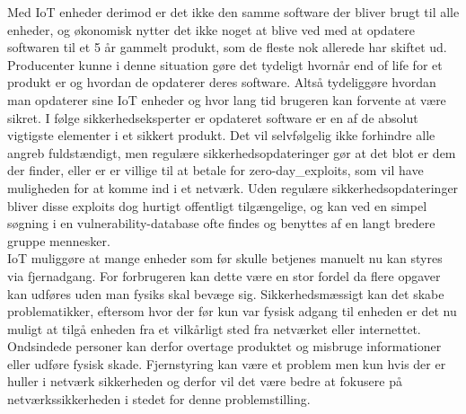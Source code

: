     Med IoT enheder derimod er det ikke den samme software der bliver brugt til alle enheder, og økonomisk nytter det ikke noget at blive ved med at opdatere softwaren til et 5 år gammelt produkt, som de fleste nok allerede har skiftet ud.
    Producenter kunne i denne situation gøre det tydeligt hvornår end of life for et produkt er og hvordan de opdaterer deres software. Altså tydeliggøre hvordan man opdaterer sine IoT enheder og hvor lang tid brugeren kan forvente at være sikret. I følge sikkerhedseksperter er opdateret software er en af de absolut vigtigste elementer i et sikkert produkt. \autocite{soups2015}
    Det vil selvfølgelig ikke forhindre alle angreb fuldstændigt, men regulære sikkerhedsopdateringer gør at det blot er dem der finder, eller er er villige til at betale for \glspl{zero-day_exploit}, som vil have muligheden for at komme ind i et netværk. Uden regulære sikkerhedsopdateringer bliver disse exploits dog hurtigt offentligt tilgængelige, og kan ved en simpel søgning i en \gls{vulnerability-database} ofte findes og benyttes af en langt bredere gruppe mennesker.\\
    IoT muliggøre at mange enheder som før skulle betjenes manuelt nu kan styres via fjernadgang. For forbrugeren kan dette være en stor fordel da flere opgaver kan udføres uden man fysiks skal bevæge sig. Sikkerhedsmæssigt kan det skabe problematikker, eftersom hvor der før kun var fysisk adgang til enheden er det nu muligt at tilgå enheden fra et vilkårligt sted fra netværket eller internettet.\\ 
    Ondsindede personer kan derfor overtage produktet og misbruge informationer eller udføre fysisk skade. Fjernstyring kan være et problem men kun hvis der er huller i netværk sikkerheden og derfor vil det være bedre at fokusere på netværkssikkerheden i stedet for denne problemstilling.\autocite{Forbes2017}\\

